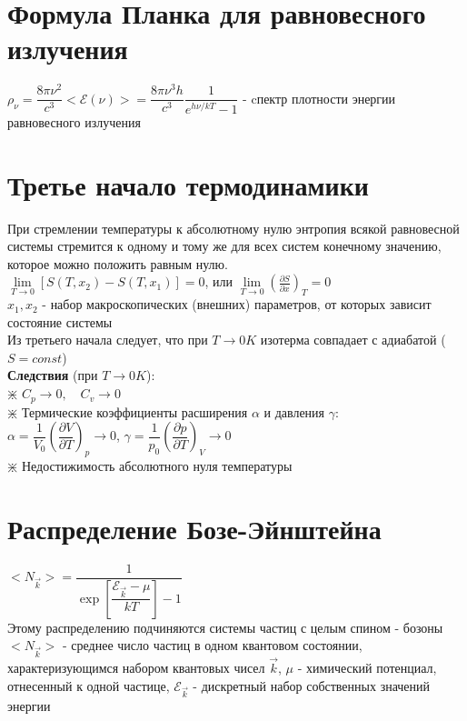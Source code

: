\begin{multicols*}{2}
		\section{Формула Планка для равновесного излучения}
		$\rho_\nu=\dfrac{8\pi \nu^2}{c^3}<\mathcal{E}(\nu)>=\dfrac{8\pi \nu^3 h}{c^3}\dfrac{1}{e^{h\nu/kT}-1}$ - cпектр плотности энергии равновесного излучения\\

		\section{Третье начало термодинамики}
		При стремлении температуры к абсолютному  нулю энтропия всякой равновесной системы стремится к одному и тому же для всех систем конечному значению, которое можно положить равным нулю.\\
		$\lim\limits_{T\to 0} [S(T, x_2) - S(T, x_1)] =0$, или $\lim\limits_{T\to 0} \left(\frac{\partial S}{\partial x}\right)_T = 0$\\
		$x_1, x_2$ - набор макроскопических (внешних) параметров, от которых зависит состояние системы\\
		Из третьего начала следует, что при $T\rightarrow 0K$ изотерма совпадает с адиабатой ($S = const$)\\
		\textbf{Следствия} (при $T\rightarrow 0K$):\\
		$\divideontimes$ $C_p \rightarrow 0, \quad C_v \rightarrow 0$\\
		$\divideontimes$ Термические коэффициенты расширения $\alpha$ и давления $\gamma$:\\
		$\alpha = \dfrac{1}{V_0}\left(\dfrac{\partial V}{\partial T}\right)_p \rightarrow 0$, \quad $\gamma = \dfrac{1}{p_0}\left(\dfrac{\partial p}{\partial T}\right)_V \rightarrow 0$\\
		$\divideontimes$ Недостижимость абсолютного нуля температуры\\

		\section{Распределение Бозе-Эйнштейна}
		$<N_{\vec{k}}> = \dfrac{1}{\exp\left[\dfrac{\mathcal{E}_{\vec{k}} - \mu}{kT}\right] - 1}$\\
		Этому распределению подчиняются системы частиц с целым спином - бозоны\\
		$<N_{\vec{k}}>$ - среднее число частиц в одном квантовом состоянии, характеризующимся набором квантовых чисел $\vec{k}$, $\mu$ - химический потенциал, отнесенный к одной частице, $\mathcal{E}_{\vec{k}}$ - дискретный набор собственных значений энергии\\


\end{multicols*}
